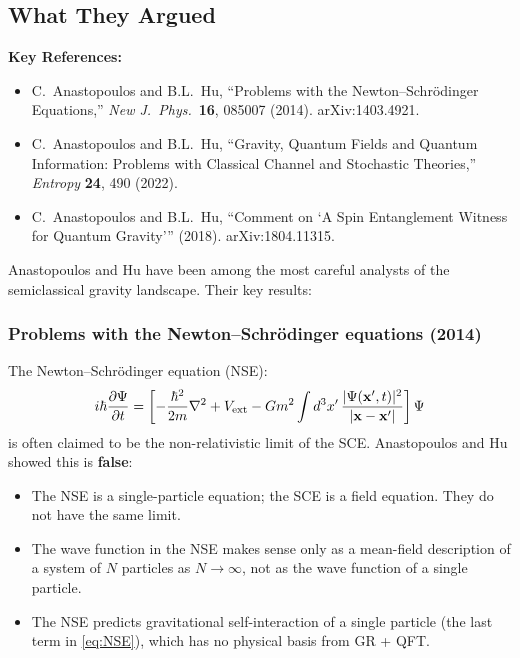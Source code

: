 \documentclass[12pt,a4paper]{article}
\begin{document}
\subsection{What They Argued}

\textbf{Key References:}
\begin{itemize}
\item C.\ Anastopoulos and B.L.\ Hu, ``Problems with the Newton--Schr\"odinger Equations,'' \textit{New J.\ Phys.}\ \textbf{16}, 085007 (2014). arXiv:1403.4921.
\item C.\ Anastopoulos and B.L.\ Hu, ``Gravity, Quantum Fields and Quantum Information: Problems with Classical Channel and Stochastic Theories,'' \textit{Entropy} \textbf{24}, 490 (2022).
\item C.\ Anastopoulos and B.L.\ Hu, ``Comment on `A Spin Entanglement Witness for Quantum Gravity'\thinspace'' (2018). arXiv:1804.11315.
\end{itemize}

Anastopoulos and Hu have been among the most careful analysts of the semiclassical gravity landscape. Their key results:

\subsubsection{Problems with the Newton--Schr\"odinger equations (2014)}

The Newton--Schr\"odinger equation (NSE):
\begin{equation}\label{eq:NSE}
i\hbar\frac{\partial\Psi}{\partial t} = \left[-\frac{\hbar^2}{2m}\nabla^2 + V_{\rm ext} - Gm^2\int d^3x'\,\frac{|\Psi(\mathbf{x}',t)|^2}{|\mathbf{x}-\mathbf{x}'|}\right]\Psi
\end{equation}
is often claimed to be the non-relativistic limit of the SCE. Anastopoulos and Hu showed this is \textbf{false}:
\begin{itemize}
\item The NSE is a single-particle equation; the SCE is a field equation. They do not have the same limit.
\item The wave function in the NSE makes sense only as a mean-field description of a system of $N$ particles as $N \to \infty$, not as the wave function of a single particle.
\item The NSE predicts gravitational self-interaction of a single particle (the last term in \eqref{eq:NSE}), which has no physical basis from GR + QFT.
\end{itemize}
\end{document}
